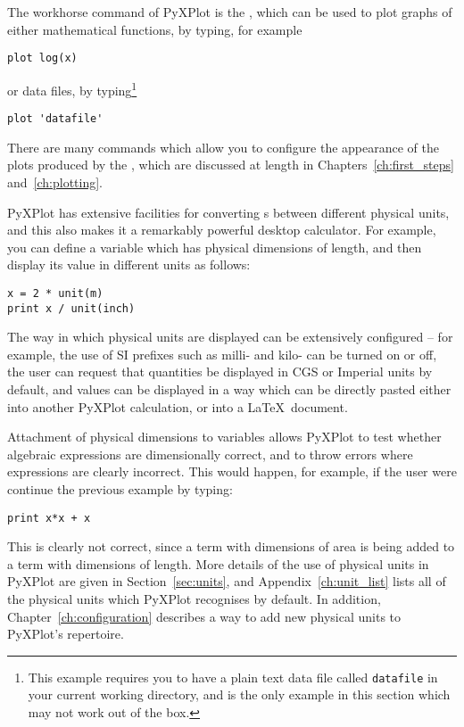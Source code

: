 The workhorse command of PyXPlot is the , which can be used to
plot graphs of either mathematical functions, by typing, for example

\begin{verbatim}
plot log(x)
\end{verbatim}

\noindent or data files, by typing\footnote{This example requires you to have a
plain text data file called {\tt datafile} in your current working directory,
and is the only example in this section which may not work out of the box.}

\begin{verbatim}
plot 'datafile'
\end{verbatim}

\noindent There are many commands which allow you to configure the appearance
of the plots produced by the , which are discussed at length in
Chapters~\ref{ch:first_steps} and~\ref{ch:plotting}.

PyXPlot has extensive facilities for converting \datafile s between different
physical units, and this also makes it a remarkably powerful desktop
calculator. For example, you can define a variable which has physical
dimensions of length, and then display its value in different units as follows:

\begin{verbatim}
x = 2 * unit(m)
print x / unit(inch)
\end{verbatim}

\noindent The way in which physical units are displayed can be extensively
configured -- for example, the use of SI prefixes such as milli- and kilo- can
be turned on or off, the user can request that quantities be displayed in CGS
or Imperial units by default, and values can be displayed in a way which can be
directly pasted either into another PyXPlot calculation, or into a \LaTeX\
document.

Attachment of physical dimensions to variables allows PyXPlot to test whether
algebraic expressions are dimensionally correct, and to throw errors where
expressions are clearly incorrect. This would happen, for example, if the user
were continue the previous example by typing:

\begin{verbatim}
print x*x + x
\end{verbatim}

\noindent This is clearly not correct, since a term with dimensions of area is
being added to a term with dimensions of length. More details of the use of
physical units in PyXPlot are given in Section~\ref{sec:units}, and
Appendix~\ref{ch:unit_list} lists all of the physical units which PyXPlot
recognises by default. In addition, Chapter~\ref{ch:configuration} describes a
way to add new physical units to PyXPlot's repertoire.

